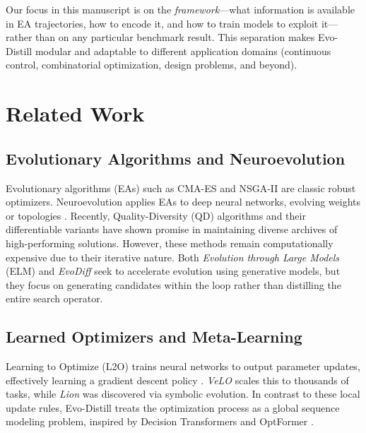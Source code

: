 \documentclass{article}
\begin{document}
Our focus in this manuscript is on the \emph{framework}---what information is available in EA trajectories, how to encode it, and how to train models to exploit it---rather than on any particular benchmark result. This separation makes Evo-Distill modular and adaptable to different application domains (continuous control, combinatorial optimization, design problems, and beyond).

\section{Related Work}
\label{sec:related}

\subsection{Evolutionary Algorithms and Neuroevolution}
Evolutionary algorithms (EAs) such as CMA-ES \cite{hansen2001completely, hansen2023cma} and NSGA-II \cite{deb2002fast} are classic robust optimizers. Neuroevolution applies EAs to deep neural networks, evolving weights or topologies \cite{stanley2002evolving, salimans2017evolution, gaier2019weight}. Recently, Quality-Diversity (QD) algorithms \cite{best2023survey} and their differentiable variants \cite{lim2024accelerated, nordqvist2023differentiable} have shown promise in maintaining diverse archives of high-performing solutions. However, these methods remain computationally expensive due to their iterative nature. Both \emph{Evolution through Large Models} (ELM) \cite{lehman2023evolution} and \emph{EvoDiff} \cite{alammar2023evodiff} seek to accelerate evolution using generative models, but they focus on generating candidates within the loop rather than distilling the entire search operator.

\subsection{Learned Optimizers and Meta-Learning}
Learning to Optimize (L2O) trains neural networks to output parameter updates, effectively learning a gradient descent policy \cite{andrychowicz2016learning, metz2022learned}. \emph{VeLO} \cite{metz2022velo} scales this to thousands of tasks, while \emph{Lion} \cite{chen2023symbolic} was discovered via symbolic evolution. In contrast to these local update rules, Evo-Distill treats the optimization process as a global sequence modeling problem, inspired by Decision Transformers \cite{chen2021decision} and OptFormer \cite{chen2022optformer}.
\end{document}
